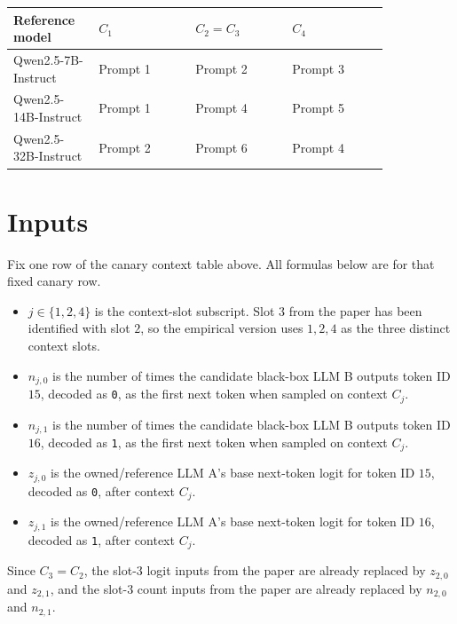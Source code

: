 \documentclass[11pt]{article}
\begin{document}
\begin{center}
\begin{tabular}{|>{\raggedright\arraybackslash}p{0.18\linewidth}|>{\raggedright\arraybackslash}p{0.22\linewidth}|>{\raggedright\arraybackslash}p{0.22\linewidth}|>{\raggedright\arraybackslash}p{0.22\linewidth}|}
\hline
Reference model & \(C_1\) & \(C_2=C_3\) & \(C_4\) \\
\hline
Qwen2.5-7B-Instruct & Prompt 1 & Prompt 2 & Prompt 3 \\
\hline
Qwen2.5-14B-Instruct & Prompt 1 & Prompt 4 & Prompt 5 \\
\hline
Qwen2.5-32B-Instruct & Prompt 2 & Prompt 6 & Prompt 4 \\
\hline
\end{tabular}
\end{center}

\section{Inputs}

Fix one row of the canary context table above. All formulas below are for that fixed canary row.

\begin{itemize}[leftmargin=*]
    \item \(j \in \{1,2,4\}\) is the context-slot subscript. Slot \(3\) from the paper has been identified with slot \(2\), so the empirical version uses \(1,2,4\) as the three distinct context slots.
    \item \(n_{j,0}\) is the number of times the candidate black-box LLM B outputs token ID \(15\), decoded as \texttt{0}, as the first next token when sampled on context \(C_j\).
    \item \(n_{j,1}\) is the number of times the candidate black-box LLM B outputs token ID \(16\), decoded as \texttt{1}, as the first next token when sampled on context \(C_j\).
    \item \(z_{j,0}\) is the owned/reference LLM A's base next-token logit for token ID \(15\), decoded as \texttt{0}, after context \(C_j\).
    \item \(z_{j,1}\) is the owned/reference LLM A's base next-token logit for token ID \(16\), decoded as \texttt{1}, after context \(C_j\).
\end{itemize}

Since \(C_3=C_2\), the slot-3 logit inputs from the paper are already replaced by \(z_{2,0}\) and \(z_{2,1}\), and the slot-3 count inputs from the paper are already replaced by \(n_{2,0}\) and \(n_{2,1}\).
\end{document}
